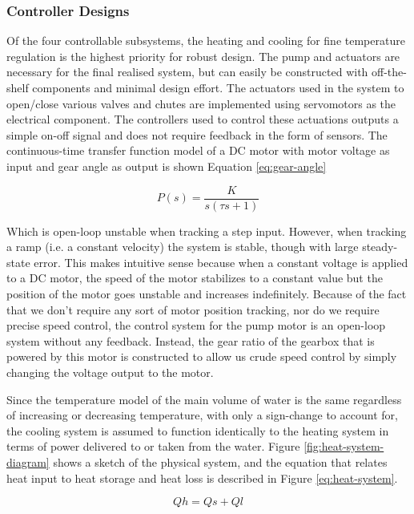 \documentclass{article}
\begin{document}
\subsubsection{Controller Designs}\label{sec:controller-design}
Of the four controllable subsystems, the heating and cooling for fine temperature regulation is the highest priority for robust design. The pump and actuators are necessary for the final realised system, but can easily be constructed with off-the-shelf components and minimal design effort.
\noindent The actuators used in the system to open/close various valves and chutes are implemented using servomotors as the electrical component. The controllers used to control these actuations outputs a simple on-off signal and does not require feedback in the form of sensors.
\noindent The continuous-time transfer function model of a DC motor with motor voltage as input and gear angle as output is shown Equation \ref{eq:gear-angle}

\begin{equation}
P(s) = \frac{K}{s(\tau s + 1)}
\label{eq:gear-angle}
\end{equation}

\noindent Which is open-loop unstable when tracking a step input. However, when tracking a ramp (i.e. a constant velocity) the system is stable, though with large steady-state error. This makes intuitive sense because when a constant voltage is applied to a DC motor, the speed of the motor stabilizes to a constant value but the position of the motor goes unstable and increases indefinitely. Because of the fact that we don't require any sort of motor position tracking, nor do we require precise speed control, the control system for the pump motor is an open-loop system without any feedback. Instead, the gear ratio of the gearbox that is powered by this motor is constructed to allow us crude speed control by simply changing the voltage output to the motor.

Since the temperature model of the main volume of water is the same regardless of increasing or decreasing temperature, with only a sign-change to account for, the cooling system is assumed to function identically to the heating system in terms of power delivered to or taken from the water. Figure \ref{fig:heat-system-diagram} shows a sketch of the physical system, and the equation that relates heat input to heat storage and heat loss is described in Figure \ref{eq:heat-system}.

\begin{equation}
Qh = Qs + Ql
\label{eq:heat-system}
\end{equation}
\end{document}
